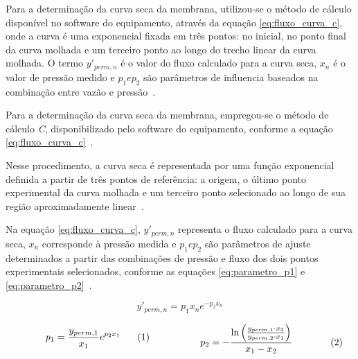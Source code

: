 Para a determinação da curva seca da membrana, utilizou-se o método de cálculo disponível no software do equipamento, através da equação \ref{eq:fluxo_curva_c}, onde a curva é uma exponencial fixada em três pontos: no inicial, no ponto final da curva molhada e um terceiro ponto ao longo do trecho linear da curva molhada. O termo $y'_{perm,n}$ é o valor do fluxo calculado para a curva seca, $x_n$ é o valor de pressão medido e $p_1 e p_2$ são parâmetros de influencia baseados na combinação entre vazão e pressão~\cite{IBFT2025}.   

Para a determinação da curva seca da membrana, empregou-se o método de cálculo \textit{C}, disponibilizado pelo software do equipamento, conforme a equação \ref{eq:fluxo_curva_c}~\cite{IBFT2025}.

Nesse procedimento, a curva seca é representada por uma função exponencial definida a partir de três pontos de referência: a origem, o último ponto experimental da curva molhada e um terceiro ponto selecionado ao longo de sua região aproximadamente linear~\cite{IBFT2025}.

Na equação \ref{eq:fluxo_curva_c}, $y'_{perm,n}$ representa o fluxo calculado para a curva seca, $x_n$ corresponde à pressão medida e $p_1 e p_2$ são parâmetros de ajuste determinados a partir das combinações de pressão e fluxo dos dois pontos experimentais selecionados, conforme as equações \ref{eq:parametro_p1} e \ref{eq:parametro_p2}~\cite{IBFT2025}.

\begin{equation}
    y'_{perm,n} = p_1 x_n e^{-p_2 x_n}
    \label{eq:fluxo_curva_c}
\end{equation}

\begin{subequations}
\begin{minipage}{0.40\textwidth}
    \begin{equation}
        p_1 = \frac{y_{perm,1}}{x_1} e^{p_2 x_1}
        \label{eq:parametro_p1}
    \end{equation}
\end{minipage}
\hfill
\begin{minipage}{0.58\textwidth}
    \begin{equation}
        p_2 = -\frac{
            \ln\left(\frac{y_{perm,1}\cdot x_2}
            {y_{perm,2}\cdot x_1}\right)
        }{x_1 - x_2}
        \label{eq:parametro_p2}
    \end{equation}
\end{minipage}
\end{subequations}


